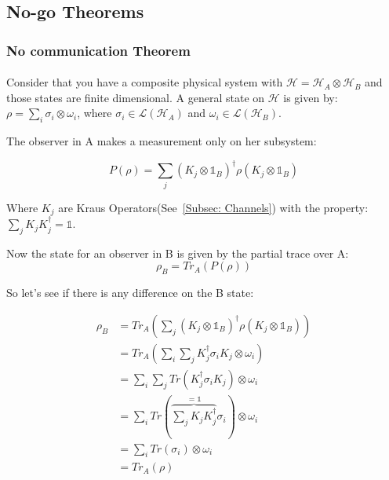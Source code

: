 \subsection{No-go Theorems}
\label{Subsec: No-go Theorems}

\subsubsection{No communication Theorem}
\label{Subsubsec: No Comunication theorem}

\paragraph{}Consider that you have a composite physical system with $\mathcal{H} = \mathcal{H}_A \otimes \mathcal{H}_B$ and those states are finite dimensional. A general state on $\mathcal{H}$ is given by: $\rho = \sum_i \sigma_i \otimes \omega_i$, where $\sigma_i \in \mathcal{L}(\mathcal{H}_A)$ and $\omega_i \in \mathcal{L}(\mathcal{H}_B)$.

The observer in A makes a measurement only on her subsystem:

\begin{equation}
    P(\rho) = \sum_j (K_j \otimes \mathds{1}_B)^{\dagger} \rho (K_j \otimes \mathds{1}_B)
\end{equation}

Where $K_j$ are Kraus Operators(See~\ref{Subsec: Channels}) with the property: $\sum_j K_j K_j^{\dagger} = \mathds{1}$.

Now the state for an observer in B is given by the partial trace over A: 
\begin{equation}
    \rho_B = Tr_A (P(\rho))
\end{equation}

So let's see if there is any difference on the B state:

\begin{equation}
    \begin{split}
        \rho_B & = Tr_A ( \sum_j (K_j \otimes \mathds{1}_B)^{\dagger} \rho (K_j \otimes \mathds{1}_B) ) \\
        & = Tr_A(\sum_i \sum_j K_j^{\dagger} \sigma_i K_j \otimes \omega_i) \\
        & = \sum_i \sum_j Tr(K_j^{\dagger} \sigma_i K_j) \otimes \omega_i \\
        & = \sum_i Tr( \overbrace{\sum_j K_j K_j^{\dagger}}^{= \mathds{1}} \sigma_i) \otimes \omega_i \\
        & = \sum_i Tr(\sigma_i) \otimes \omega_i \\
        & = Tr_A(\rho)
    \end{split}
\end{equation}

